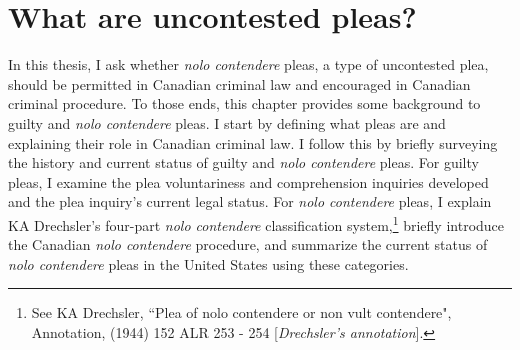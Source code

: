 \chapter{What are uncontested pleas?}

\setcounter{footnote}{19}

In this thesis, I ask whether \textit{nolo contendere} pleas, a type of uncontested plea, should be permitted in Canadian criminal law and encouraged in Canadian criminal procedure. To those ends, this chapter provides some background to guilty and \textit{nolo contendere} pleas. I start by defining what pleas are and explaining their role in Canadian criminal law. I follow this by briefly surveying the history and current status of guilty and \textit{nolo contendere} pleas. For guilty pleas, I examine the plea voluntariness and comprehension inquiries developed and the plea inquiry's current legal status. For \textit{nolo contendere} pleas, I explain KA Drechsler's four-part \textit{nolo contendere} classification system,\footnote{See KA Drechsler, ``Plea of nolo contendere or non vult contendere", Annotation, (1944) 152 ALR 253 - 254 [\textit{Drechsler's annotation}].} briefly introduce the Canadian \textit{nolo contendere} procedure, and summarize the current status of \textit{nolo contendere} pleas in the United States using these categories.

